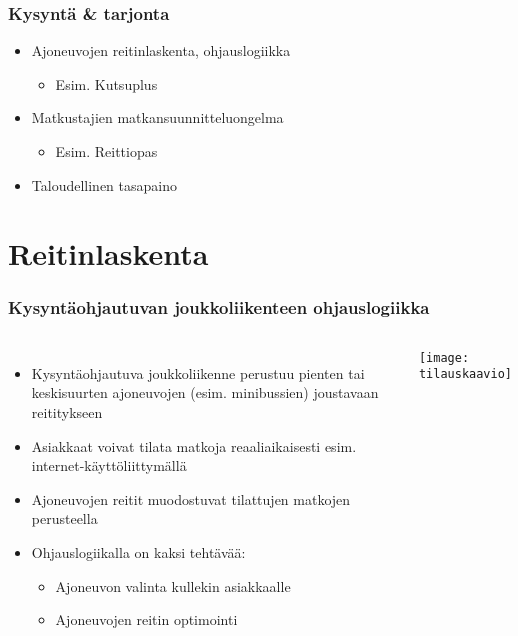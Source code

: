\documentclass{beamer}
\begin{document}
\begin{frame}
  \frametitle{Kysyntä \& tarjonta}   %
  \begin{itemize}
\item
Ajoneuvojen reitinlaskenta, ohjauslogiikka
\begin{itemize}
\item
Esim. Kutsuplus
\end{itemize}
\item
Matkustajien matkansuunnitteluongelma
\begin{itemize}
\item
Esim. Reittiopas
\end{itemize}
\item
Taloudellinen tasapaino
\end{itemize}


 
\end{frame}

\section{Reitinlaskenta}
\begin{frame}
  \frametitle{Kysyntäohjautuvan joukkoliikenteen ohjauslogiikka}   %
  \begin{columns}[c]
  \column{3.5in}  %
  \begin{itemize}
    \item 
    Kysyntäohjautuva joukkoliikenne perustuu pienten tai keskisuurten ajoneuvojen (esim. minibussien) joustavaan reititykseen 
    \item
    Asiakkaat voivat tilata matkoja reaaliaikaisesti esim. internet-käyttöliittymällä
    \item
    Ajoneuvojen reitit muodostuvat tilattujen matkojen perusteella
    \item
    Ohjauslogiikalla on kaksi tehtävää:
    \begin{itemize}
    \item
    Ajoneuvon valinta kullekin asiakkaalle
    \item
    Ajoneuvojen reitin optimointi
    \end{itemize}
  \end{itemize}
    \column{1.5in}
\centering

\texttt{[image: tilauskaavio]}
 
  \end{columns}
\end{frame}
\end{document}
